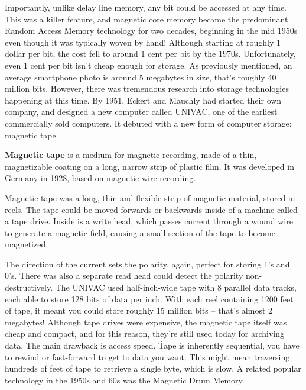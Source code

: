 
Importantly, unlike delay line memory, any bit could be accessed at any time. This was a killer feature, and magnetic
core memory became the predominant Random Access Memory technology for two decades, beginning in the mid 1950s even
though it was typically woven by hand! Although starting at roughly 1 dollar per bit, the cost fell to around 1 cent
per bit by the 1970s. Unfortunately, even 1 cent per bit isn't cheap enough for storage. As previously mentioned, an
average smartphone photo is around 5 megabytes in size, that's roughly 40 million bits. \v

However, there was tremendous research into storage technologies happening at this time. By 1951, Eckert and Mauchly
had started their own company, and designed a new computer called UNIVAC, one of the earliest commercially sold
computers. It debuted with a new form of computer storage: magnetic tape.

\textbf{Magnetic tape} is a medium for magnetic recording, made of a thin, magnetizable coating on a long, narrow
strip of plastic film. It was developed in Germany in 1928, based on magnetic wire recording.
\ed

Magnetic tape was a long, thin and flexible strip of magnetic material, stored in reels. The tape could be moved
forwards or backwards inside of a machine called a tape drive. Inside is a write head, which passes current through a
wound wire to generate a magnetic field, causing a small section of the tape to become magnetized.


The direction of the current sets the polarity, again, perfect for storing 1's and 0's. There was also a separate
read head could detect the polarity non-destructively. The UNIVAC used half-inch-wide tape with 8 parallel data
tracks, each able to store 128 bits of data per inch. With each reel containing 1200 feet of tape, it meant you could
store roughly 15 million bits – that's almost 2 megabytes! Although tape drives were expensive, the magnetic tape
itself was cheap and compact, and for this reason, they're still used today for archiving data. The main drawback is
access speed. \v

Tape is inherently sequential, you have to rewind or fast-forward to get to data you want. This might mean traversing
hundreds of feet of tape to retrieve a single byte, which is slow. A related popular technology in the 1950s and 60s
was the Magnetic Drum Memory.

